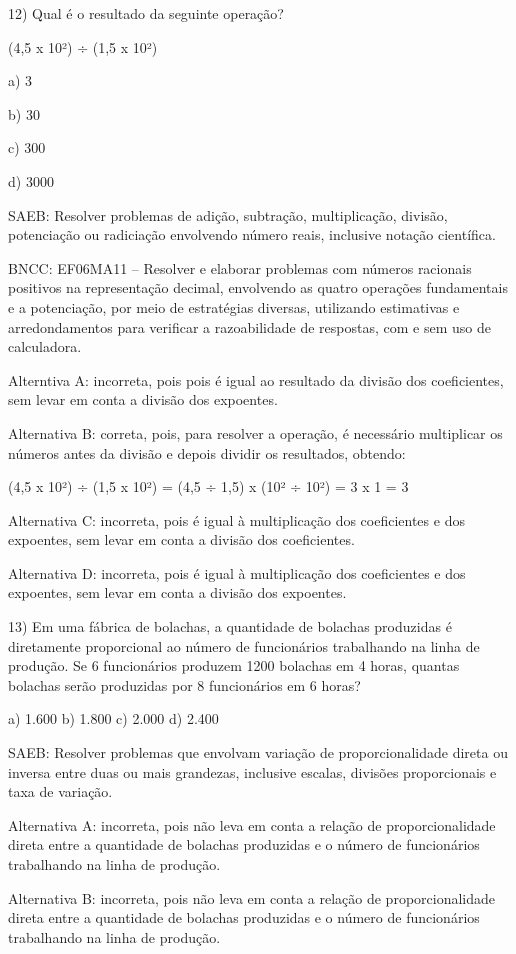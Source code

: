 12) Qual é o resultado da seguinte operação?

(4,5 x 10²) ÷ (1,5 x 10²)

a) 3

b) 30

c) 300

d) 3000

SAEB: Resolver problemas de adição, subtração, multiplicação, divisão,
potenciação ou radiciação envolvendo número reais, inclusive notação
científica.

BNCC: EF06MA11 -- Resolver e elaborar problemas com números racionais
positivos na representação decimal, envolvendo as quatro operações
fundamentais e a potenciação, por meio de estratégias diversas,
utilizando estimativas e arredondamentos para verificar a razoabilidade
de respostas, com e sem uso de calculadora.~

Alterntiva A: incorreta, pois pois é igual ao resultado da divisão dos
coeficientes, sem levar em conta a divisão dos expoentes.

Alternativa B: correta, pois, para resolver a operação, é necessário
multiplicar os números antes da divisão e depois dividir os resultados,
obtendo:

(4,5 x 10²) ÷ (1,5 x 10²) = (4,5 ÷ 1,5) x (10² ÷ 10²) = 3 x 1 = 3

Alternativa C: incorreta, pois é igual à multiplicação dos coeficientes
e dos expoentes, sem levar em conta a divisão dos coeficientes.

Alternativa D: incorreta, pois é igual à multiplicação dos coeficientes
e dos expoentes, sem levar em conta a divisão dos expoentes.

13) Em uma fábrica de bolachas, a quantidade de bolachas produzidas é
diretamente proporcional ao número de funcionários trabalhando na linha
de produção. Se 6 funcionários produzem 1200 bolachas em 4 horas,
quantas bolachas serão produzidas por 8 funcionários em 6 horas?

a) 1.600 b) 1.800 c) 2.000 d) 2.400

SAEB: Resolver problemas que envolvam variação de proporcionalidade
direta ou inversa entre duas ou mais grandezas, inclusive escalas,
divisões proporcionais e taxa de variação.

Alternativa A: incorreta, pois não leva em conta a relação de
proporcionalidade direta entre a quantidade de bolachas produzidas e o
número de funcionários trabalhando na linha de produção.

Alternativa B: incorreta, pois não leva em conta a relação de
proporcionalidade direta entre a quantidade de bolachas produzidas e o
número de funcionários trabalhando na linha de produção.

